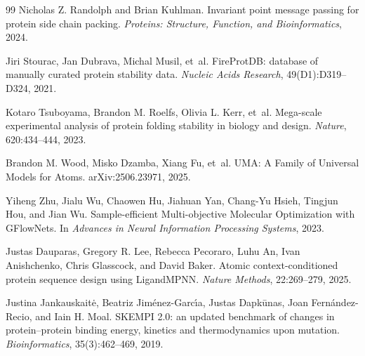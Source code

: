 \documentclass[11pt]{article}
\begin{document}
\begin{thebibliography}{99}
Nicholas Z. Randolph and Brian Kuhlman.
\newblock Invariant point message passing for protein side chain packing.
\newblock \emph{Proteins: Structure, Function, and Bioinformatics}, 2024.

Jiri Stourac, Jan Dubrava, Michal Musil, et~al.
\newblock FireProtDB: database of manually curated protein stability data.
\newblock \emph{Nucleic Acids Research}, 49(D1):D319--D324, 2021.

Kotaro Tsuboyama, Brandon M. Roelfs, Olivia L. Kerr, et~al.
\newblock Mega-scale experimental analysis of protein folding stability in biology and design.
\newblock \emph{Nature}, 620:434--444, 2023.

Brandon M. Wood, Misko Dzamba, Xiang Fu, et~al.
\newblock UMA: A Family of Universal Models for Atoms.
\newblock arXiv:2506.23971, 2025.

Yiheng Zhu, Jialu Wu, Chaowen Hu, Jiahuan Yan, Chang-Yu Hsieh, Tingjun Hou, and Jian Wu.
\newblock Sample-efficient Multi-objective Molecular Optimization with GFlowNets.
\newblock In \emph{Advances in Neural Information Processing Systems}, 2023.



Justas Dauparas, Gregory R. Lee, Rebecca Pecoraro, Luhu An, Ivan Anishchenko, Chris Glasscock, and David Baker.
\newblock Atomic context-conditioned protein sequence design using LigandMPNN.
\newblock \emph{Nature Methods}, 22:269--279, 2025.

Justina Jankauskait{\.e}, Beatriz Jim{\'e}nez-Garc{\'\i}a, Justas Dapk{\=u}nas, Joan Fern{\'a}ndez-Recio, and Iain H. Moal.
\newblock SKEMPI 2.0: an updated benchmark of changes in protein--protein binding energy, kinetics and thermodynamics upon mutation.
\newblock \emph{Bioinformatics}, 35(3):462--469, 2019.


\end{thebibliography}
\end{document}
